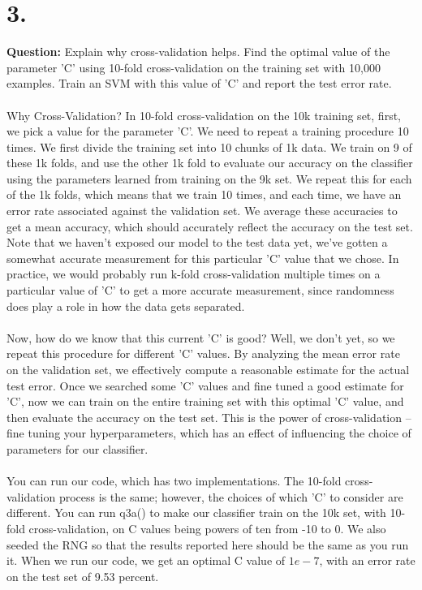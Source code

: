 \documentclass[11pt]{article}
\begin{document}
\section*{3.}
\textbf{Question:} Explain why cross-validation helps. Find the optimal value of the parameter 'C' using 10-fold cross-validation on the training set with 10,000 examples. Train an SVM with this value of 'C' and report the test error rate.
\\\\
Why Cross-Validation? In 10-fold cross-validation on the 10k training set, first, we pick a value for the parameter 'C'. We need to repeat a training procedure 10 times. We first divide the training set into 10 chunks of 1k data. We train on 9 of these 1k folds, and use the other 1k fold to evaluate our accuracy on the classifier using the parameters learned from training on the 9k set. We repeat this for each of the 1k folds, which means that we train 10 times, and each time, we have an error rate associated against the validation set. We average these accuracies to get a mean accuracy, which should accurately reflect the accuracy on the test set. Note that we haven't exposed our model to the test data yet, we've gotten a somewhat accurate measurement for this particular 'C' value that we chose. In practice, we would probably run k-fold cross-validation multiple times on a particular value of 'C' to get a more accurate measurement, since randomness does play a role in how the data gets separated.
\\\\
Now, how do we know that this current 'C' is good? Well, we don't yet, so we repeat this procedure for different 'C' values. By analyzing the mean error rate on the validation set, we effectively compute a reasonable estimate for the actual test error. Once we searched some 'C' values and fine tuned a good estimate for 'C', now we can train on the entire training set with this optimal 'C' value, and then evaluate the accuracy on the test set. This is the power of cross-validation -- fine tuning your hyperparameters, which has an effect of influencing the choice of parameters for our classifier.
\\\\
You can run our code, which has two implementations. The 10-fold cross-validation process is the same; however, the choices of which 'C' to consider are different. You can run q3a() to make our classifier train on the 10k set, with 10-fold cross-validation, on C values being powers of ten from -10 to 0. We also seeded the RNG so that the results reported here should be the same as you run it. When we run our code, we get an optimal C value of $1e-7$, with an error rate on the test set of 9.53 percent.
\end{document}
